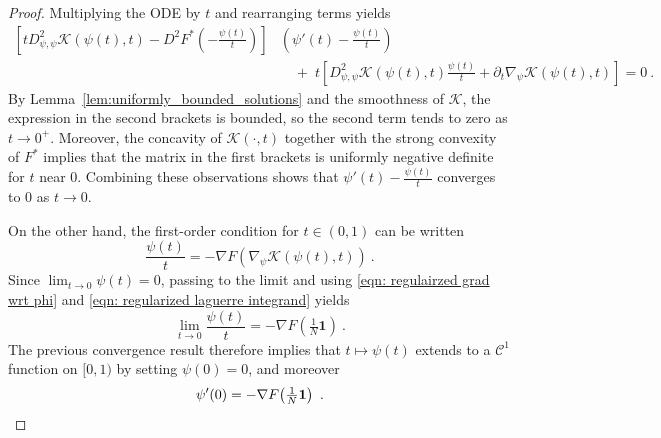 \documentclass[10pt,a4paper]{amsart}
\begin{document}
\begin{proof}
    Multiplying the ODE by $t$ and rearranging terms yields
    \begin{align}
        \left[tD^2_{\psi,\psi}\mathcal{K}(\psi(t),t)- D^2F^*\left(-\frac{\psi(t)}{t}\right)\right] &\left(\psi'(t)-\frac{\psi(t)}{t}\right) \nonumber\\[4pt]
        &\quad +\; t\left[D^2_{\psi,\psi}\mathcal{K}(\psi(t),t)\frac{\psi(t)}{t}+\partial_t\nabla_\psi\mathcal{K}(\psi(t),t)\right]= 0\ .\label{eqn: rearranged ODE}
    \end{align}
    By Lemma~\ref{lem:uniformly_bounded_solutions} and the smoothness of $\mathcal{K}$, the expression in the second brackets is bounded, so the second term tends to zero as $t\to 0^+$. Moreover, the concavity of $\mathcal{K}(\cdot,t)$ together with the strong convexity of $F^*$ implies that the matrix in the first brackets is uniformly negative definite for $t$ near $0$. Combining these observations shows that $\psi'(t)-\frac{\psi(t)}{t}$ converges to $0$ as $t\to 0$.
    
    On the other hand, the first-order condition for $t\in(0,1)$ can be written
    \[
        \frac{\psi(t)}{t}=-\nabla F(\nabla_\psi \mathcal{K}(\psi(t),t))\ .
    \]
    Since $\lim_{t\to0}\psi(t)=0$, passing to the limit and using \eqref{eqn: regulairzed grad wrt phi} and \eqref{eqn: regularized laguerre integrand} yields
  \begin{equation}\label{eqn: limit of z}
        \lim_{t\to0}\frac{\psi(t)}{t}= -\nabla F\!\left(\tfrac{1}{N}\mathbf 1\right)\ .
 \end{equation}
    The previous convergence result therefore implies that $t\mapsto \psi(t)$ extends to a $\mathcal{C}^1$ function on $[0,1)$ by setting $\psi(0)=0$, and moreover
\begin{equation}\label{eqn: initial derivative}
    \psi'(0)=-\nabla F\!\left(\tfrac{1}{N}\mathbf 1\right)\ .\qedhere
\end{equation}
\end{proof}
\end{document}
